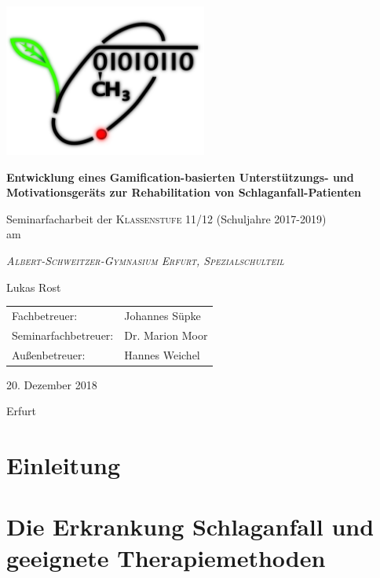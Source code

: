 \documentclass[a4paper, 11pt, titlepage, bibliography=totocnumbered]{scrartcl}
\begin{document}
\begin{titlepage}
	\centering
	\includegraphics[width=0.5\textwidth]{pics/logo}\par\vspace{1cm}
	{\huge\bfseries Entwicklung eines Gamification-basierten Unterstützungs- und Motivationsgeräts zur Rehabilitation von Schlaganfall-Patienten\par}
	\vspace{2cm}
	{\large Seminarfacharbeit der \textsc{Klassenstufe 11/12} (Schuljahre 2017-2019)\\ am \\}
		{\scshape\Large\itshape Albert-Schweitzer-Gymnasium Erfurt, Spezialschulteil \par}
	\vspace{2cm}
	{\Large Lukas Rost}
	\vfill
	{\begin{tabular}{ll}
	\Large Fachbetreuer: & \Large Johannes Süpke \\[5pt]
	\Large Seminarfachbetreuer: & \Large Dr. Marion Moor \\[5pt]
	\Large Außenbetreuer: & \Large Hannes Weichel \\
	\end{tabular}}
	\vfill
	{\Large 20. Dezember 2018\par Erfurt}
\end{titlepage}

\newpage

\tableofcontents
\setcounter{page}{1}
\newpage

\section{Einleitung}


\newpage
\section{Die Erkrankung Schlaganfall und geeignete Therapiemethoden}

\end{document}
